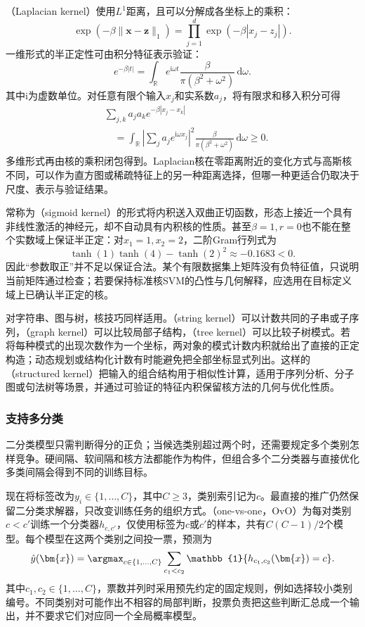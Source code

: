 （Laplacian kernel）使用$L^1$距离，且可以分解成各坐标上的乘积：
\[
  \exp(-\beta\lVert\bm{x}-\bm{z}\rVert_1)
  =\prod_{j=1}^d\exp(-\beta|x_j-z_j|).
\]
一维形式的半正定性可由积分特征表示验证：
\[
  e^{-\beta|t|}
  =\int_{\mathbb{R}}e^{\mathrm{i}\omega t}
      \frac{\beta}{\pi(\beta^2+\omega^2)}\,\mathrm{d}\omega.
\]
其中$\mathrm{i}$为虚数单位。对任意有限个输入$x_j$和实系数$a_j$，将有限求和移入积分可得
\[
  \begin{aligned}
    &\sum_{j,k}a_j a_k e^{-\beta|x_j-x_k|}\\
    &\quad=\int_{\mathbb{R}}
      \left|\sum_j a_j e^{\mathrm{i}\omega x_j}\right|^2
      \frac{\beta}{\pi(\beta^2+\omega^2)}\,\mathrm{d}\omega
      \ge0.
  \end{aligned}
\]
多维形式再由核的乘积闭包得到。Laplacian核在零距离附近的变化方式与高斯核不同，可以作为直方图或稀疏特征上的另一种距离选择，但哪一种更适合仍取决于尺度、表示与验证结果。

常称为（sigmoid kernel）的形式将内积送入双曲正切函数，形态上接近一个具有非线性激活的神经元，却不自动具有内积核的性质。甚至$\beta=1,r=0$也不能在整个实数域上保证半正定：对$x_1=1,x_2=2$，二阶Gram行列式为
\[
  \tanh(1)\tanh(4)-\tanh(2)^2
  \approx-0.1683<0.
\]
因此“参数取正”并不足以保证合法。某个有限数据集上矩阵没有负特征值，只说明当前矩阵通过检查；若要保持标准核SVM的凸性与几何解释，应选用在目标定义域上已确认半正定的核。

对字符串、图与树，核技巧同样适用。（string kernel）可以计数共同的子串或子序列，（graph kernel）可以比较局部子结构，（tree kernel）可以比较子树模式。若将每种模式的出现次数作为一个坐标，两对象的模式计数内积就给出了直接的正定构造；动态规划或结构化计数有时能避免把全部坐标显式列出。这样的（structured kernel）把输入的组合结构用于相似性计算，适用于序列分析、分子图或句法树等场景，并通过可验证的特征内积保留核方法的几何与优化性质。

\subsubsection{支持多分类}
\label{sec:classification-svm-multiclass}

二分类模型只需判断得分的正负；当候选类别超过两个时，还需要规定多个类别怎样竞争。硬间隔、软间隔和核方法都能作为构件，但组合多个二分类器与直接优化多类间隔会得到不同的训练目标。

现在将标签改为$y_i\in\{1,\ldots,C\}$，其中$C\ge3$，类别索引记为$c$。最直接的推广仍然保留二分类求解器，只改变训练任务的组织方式。（one-vs-one，OvO）为每对类别$c<c'$训练一个分类器$h_{c,c'}$，仅使用标签为$c$或$c'$的样本，共有$C(C-1)/2$个模型。每个模型在这两个类别之间投一票，预测为
\[
  \hat y(\bm{x})
  =\argmax_{c\in\{1,\ldots,C\}}
     \sum_{c_1<c_2}\mathbb{1}\{h_{c_1,c_2}(\bm{x})=c\}.
\]
其中$c_1,c_2\in\{1,\ldots,C\}$，票数并列时采用预先约定的固定规则，例如选择较小类别编号。不同类别对可能作出不相容的局部判断，投票负责把这些判断汇总成一个输出，并不要求它们对应同一个全局概率模型。

